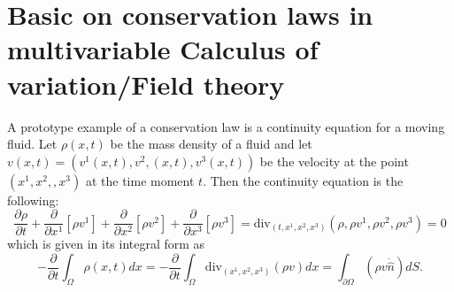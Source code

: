 \documentclass{article}
\newcommand{\pd}[1]{\frac{\partial}{\partial #1}}
\newcommand{\pdof}[2]{\frac{\partial #1}{\partial #2}}
\begin{document}
\section{Basic on conservation laws in multivariable Calculus of variation/Field theory}
A prototype example  of a conservation law is a continuity equation for a moving fluid. Let $\rho(x,t)$ be the mass density of a fluid and let $v(x,t) = (v^1(x,t),v^2,(x,t),v^3(x,t))$ be the velocity at the point $(x^1,x^2,,x^3)$ at the time moment $t$. Then the continuity equation is the following:
\[\pdof{\rho}{t} + \pd{x^1}[\rho v^1] + \pd{x^2}[\rho v^2] + \pd{x^3}[\rho v^3] = \text{div}_{(t,x^1,x^2,x^3)}(\rho,\rho v^1,\rho v^2, \rho v^3) = 0\]
which is given in its integral form as
\[-\pd{t}\int_{\Omega}\rho(x,t)dx = -\pd{t}\int_{\Omega}\text{div}_{(x^1,x^2,x^3)}(\rho v)dx = \int_{\partial \Omega}(\rho v\dot \hat n)dS.\]
\end{document}
